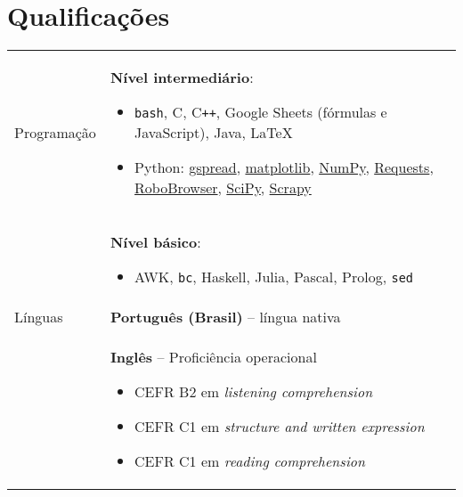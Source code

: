 \documentclass{article}
\newenvironment{contenttable}[1]{
    \section*{#1}
    \newcolumntype{L}{>{\bf \raggedleft}p{0.13\textwidth}}
    \newcolumntype{R}{p{0.82\textwidth}}
    \begin{tabular}{L!{\color{lightgray} \vrule}R}
}{
    \end{tabular}
}
\newenvironment{smallitem}{
    \vspace{-2mm}
    \begin{itemize}
    \setlength{\parskip}{0pt}
    \setlength{\itemsep}{2pt}
}{
    \vspace{-2mm}
    \end{itemize}
}
\begin{document}
\begin{contenttable}{Qualificações}
    Programação & \textbf{Nível intermediário}:
    \begin{smallitem}
        \item \verb!bash!, C, C\verb!++!, Google Sheets (fórmulas e
        JavaScript), Java, \LaTeX
        \item Python: \href{https://github.com/burnash/gspread}{gspread},
        \href{http://matplotlib.org/}{matplotlib},
        \href{http://www.numpy.org/}{NumPy},
        \href{http://docs.python-requests.org/en/latest/#}{Requests},
        \href{https://github.com/jmcarp/robobrowser}{RoboBrowser},
        \href{http://www.scipy.org/}{SciPy},
        \href{http://scrapy.org/}{Scrapy}
    \end{smallitem} \\

    & \textbf{Nível básico}:
    \begin{smallitem}
        \item AWK, \verb!bc!, Haskell, Julia, Pascal, Prolog, \verb!sed!
    \end{smallitem} \\

    Línguas & \textbf{Português (Brasil)} -- língua nativa \\
    & \textbf{Inglês} -- Proficiência operacional
    \begin{smallitem}
        \item CEFR B2 em \textit{listening comprehension}
        \item CEFR C1 em \textit{structure and written expression}
        \item CEFR C1 em \textit{reading comprehension}
    \end{smallitem}
\end{contenttable}
\end{document}
